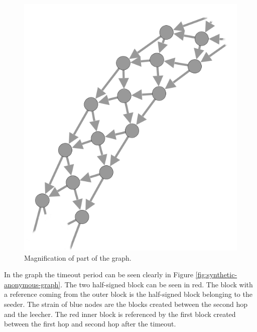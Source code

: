 \begin{figure}
	\centerline{\includegraphics[scale=0.5]{experimentation/anonymous/anonymous-magnified.png}}
	\caption{Magnification of part of the graph.}
	\label{fig:synthetic-anonymous-graph-magnified}
\end{figure}

In the graph the timeout period can be seen clearly in Figure \ref{fig:synthetic-anonymous-graph}.
The two half-signed block can be seen in red.
The block with a reference coming from the outer block is the half-signed block belonging to the seeder.
The strain of blue nodes are the blocks created between the second hop and the leecher.
The red inner block is referenced by the first block created between the first hop and second hop after the timeout.





